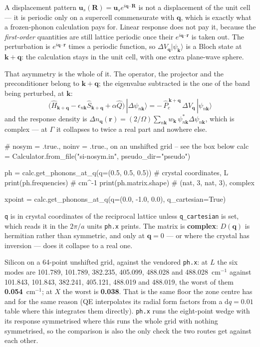 \documentclass[11pt,a4paper]{article}
\newcommand{\code}[1]{\texttt{\small #1}}
\begin{document}
A displacement pattern $\mathbf u_s(\mathbf R) = \mathbf u_s e^{i\mathbf q\cdot\mathbf R}$
is not a displacement of the unit cell --- it is periodic only on a supercell
commensurate with $\mathbf q$, which is exactly what a frozen-phonon calculation
pays for. Linear response does not pay it, because the \emph{first-order}
quantities are still lattice periodic once their $e^{i\mathbf q\cdot\mathbf r}$
is taken out. The perturbation is $e^{i\mathbf q\cdot\mathbf r}$ times a
periodic function, so $\Delta V_{\mathbf q}|\psi_{\mathbf k}\rangle$ is a Bloch
state at $\mathbf k + \mathbf q$: the calculation stays in the unit cell, with
one extra plane-wave sphere.

That asymmetry is the whole of it. The operator, the projector and the
preconditioner belong to $\mathbf k+\mathbf q$; the eigenvalue subtracted is the
one of the band being perturbed, at $\mathbf k$:
\begin{equation*}
\big(\hat H_{\mathbf k+\mathbf q} - \epsilon_{n\mathbf k}\hat S_{\mathbf k+\mathbf q}
   + \alpha\hat Q\big)\,|\Delta\psi_{n\mathbf k}\rangle
 = -\,\hat P_c^{\,\mathbf k+\mathbf q}\,\Delta V_{\mathbf q}\,|\psi_{n\mathbf k}\rangle
\end{equation*}
and the response density is $\Delta n_{\mathbf q}(\mathbf r) = (2/\Omega)\sum_{n\mathbf k}
w_{\mathbf k}\,\psi^{*}_{n\mathbf k}\Delta\psi_{n\mathbf k}$, which is complex ---
at $\Gamma$ it collapses to twice a real part and nowhere else.

\begin{pycode}
# nosym = .true., noinv = .true., on an unshifted grid -- see the box below
calc = Calculator.from_file("si-nosym.in", pseudo_dir="pseudo")

ph = calc.get_phonons_at_q(q=(0.5, 0.5, 0.5))          # crystal coordinates, L
print(ph.frequencies)                                   # cm^-1
print(ph.matrix.shape)                                  # (nat, 3, nat, 3), complex

xpoint = calc.get_phonons_at_q(q=(0.0, -1.0, 0.0), q_cartesian=True)
\end{pycode}

\noindent \code{q} is in crystal coordinates of the reciprocal lattice unless
\code{q\_cartesian} is set, which reads it in the $2\pi/a$ units \code{ph.x}
prints. The matrix is \textbf{complex}: $D(\mathbf q)$ is hermitian rather than
symmetric, and only at $\mathbf q = 0$ --- or where the crystal has inversion
--- does it collapse to a real one.

Silicon on a 64-point unshifted grid, against the vendored \code{ph.x}: at $L$
the six modes are 101.789, 101.789, 382.235, 405.099, 488.028 and
488.028~cm$^{-1}$ against 101.843, 101.843, 382.241, 405.121, 488.019 and
488.019, the worst of them \textbf{0.054}~cm$^{-1}$; at $X$ the worst is
\textbf{0.038}. That is the same floor the zone centre has and for the same
reason (QE interpolates its radial form factors from a $\mathrm{d}q = 0.01$
table where this integrates them directly). \code{ph.x} runs the eight-point
wedge with its response symmetrised where this runs the whole grid with nothing
symmetrised, so the comparison is also the only check the two routes get
against each other.
\end{document}
